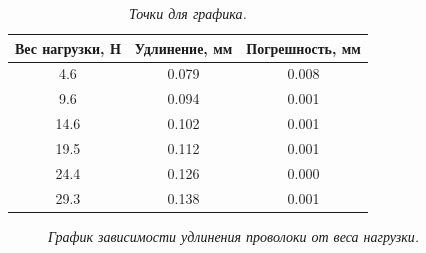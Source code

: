 \documentclass[a4paper,12pt]{report}
\begin{document}
\begin{table}[h!]
\begin{center}
\begin{tabular}{|c|c|c|}
\hline
Вес   нагрузки, Н & Удлинение, мм & Погрешность, мм \\ \hline
4.6               & 0.079         & 0.008           \\ \hline
9.6               & 0.094         & 0.001           \\ \hline
14.6              & 0.102         & 0.001           \\ \hline
19.5              & 0.112         & 0.001           \\ \hline
24.4              & 0.126         & 0.000           \\ \hline
29.3              & 0.138         & 0.001           \\ \hline
\end{tabular}
\end{center}
\caption{\textit{Точки для графика.}}
\end{table}

\begin{figure}[h!]
\caption{\textit{График зависимости удлинения проволоки от веса нагрузки.}}
\end{figure}
\end{document}
